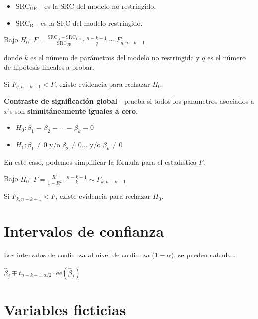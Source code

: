 \documentclass[10pt, a4paper, landscape]{extarticle}
\newcommand{\se}{\mathrm{ee}}
\newcommand{\SSR}{\mathrm{SRC}}
\begin{document}
\begin{multicols}{3}
\begin{itemize}[leftmargin=*]
	\item \textbf{$\SSR_\mathrm{UR}$} - es la $\SSR$ del modelo no restringido.
	\item \textbf{$\SSR_\mathrm{R}$} - es la $\SSR$ del modelo restringido.
\end{itemize}

\begin{center}
	Bajo $H_0$: \quad $F = \frac{\SSR_\mathrm{R} - \SSR_\mathrm{UR}}{\SSR_\mathrm{UR}} \cdot \frac{n - k - 1}{q} \sim F_{q, n - k - 1}$
\end{center}

donde $k$ es el número de parámetros del modelo no restringido y $q$ es el número de hipótesis lineales a probar.

Si $F_{q, n - k - 1} < F$, existe evidencia para rechazar $H_0$.

\textbf{Contraste de significación global} - prueba si todos los parametros asociados a $x$'s son \textbf{simultáneamente iguales a cero}.

\begin{itemize}[leftmargin=*]
	\item $H_0: \beta_1 = \beta_2 = \cdots = \beta_k = 0$
	\item $H_1: \beta_1 \neq 0$ y/o $\beta_2 \neq 0 \ldots$ y/o $\beta_k \neq 0$
\end{itemize}

En este caso, podemos simplificar la fórmula para el estadístico $F$.

\begin{center}
	Bajo $H_0$: \quad $F = \frac{R^2}{1 - R^2} \cdot \frac{n - k - 1}{k} \sim F_{k, n - k - 1}$
\end{center}

Si $F_{k, n - k - 1} < F$, existe evidencia para rechazar $H_0$.

\section*{Intervalos de confianza}

Los intervalos de confianza al nivel de confianza ($1 - \alpha$), se pueden calcular:

\begin{center}
	$\hat{\beta}_j \mp t_{n - k - 1, \alpha/2} \cdot \se(\hat{\beta}_j)$
\end{center}

\section*{Variables ficticias}


\end{multicols}
\end{document}
